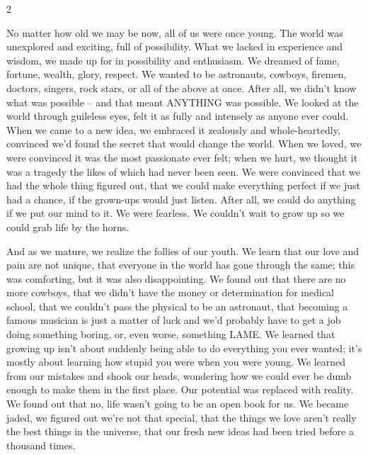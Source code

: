 \label{cha:introduction}

\begin{multicols}{2}

\noindent No matter how old we may be now, all of us were once young. The world was unexplored and exciting, full of possibility. What we lacked in experience and wisdom, we made up for in possibility and enthusiasm. We dreamed of fame, fortune, wealth, glory, respect. We wanted to be astronauts, cowboys, firemen, doctors, singers, rock stars, or all of the above at once. After all, we didn't know what was possible – and that meant ANYTHING was possible. We looked at the world through guileless eyes, felt it as fully and intensely as anyone ever could. When we came to a new idea, we embraced it zealously and whole-heartedly, convinced we'd found the secret that would change the world. When we loved, we were convinced it was the most passionate ever felt; when we hurt, we thought it was a tragedy the likes of which had never been seen. We were convinced that we had the whole thing figured out, that we could make everything perfect if we just had a chance, if the grown-ups would just listen. After all, we could do 
anything if we put our mind to it. We were fearless. We couldn't wait to grow up so we could grab life by the horns.

And as we mature, we realize the follies of our youth. We learn that our love and pain are not unique, that everyone in the world has gone through the same; this was comforting, but it was also disappointing. We found out that there are no more cowboys, that we didn't have the money or determination for medical school, that we couldn't pass the physical to be an astronaut, that becoming a famous musician is just a matter of luck and we'd probably have to get a job doing something boring, or, even worse, something LAME. We learned that growing up isn't about suddenly being able to do everything you ever wanted; it's mostly about learning how stupid you were when you were young. We learned from our mistakes and shook our heads, wondering how we could ever be dumb enough to make them in the first place. Our potential was replaced with reality. We found out that no, life wasn't going to be an open book for us. We became jaded, we figured out we're not that special, that the things we love aren't really the best things in the universe, that our fresh new ideas had been tried before a thousand times.


\end{multicols}
